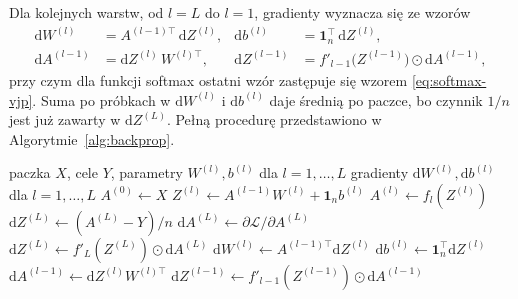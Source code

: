 Dla kolejnych warstw, od $l = L$ do $l = 1$, gradienty wyznacza się ze wzorów
\begin{equation}
    \begin{aligned}
        \mathrm{d}W^{(l)} &= A^{(l-1)\top} \, \mathrm{d}Z^{(l)}, &
        \mathrm{d}b^{(l)} &= \mathbf{1}_n^{\top} \, \mathrm{d}Z^{(l)}, \\
        \mathrm{d}A^{(l-1)} &= \mathrm{d}Z^{(l)} \, W^{(l)\top}, &
        \mathrm{d}Z^{(l-1)} &= f'_{l-1}\big(Z^{(l-1)}\big) \odot \mathrm{d}A^{(l-1)} ,
    \end{aligned}
    \label{eq:backprop}
\end{equation}
przy czym dla funkcji softmax ostatni wzór zastępuje się wzorem \eqref{eq:softmax-vjp}. Suma po próbkach w $\mathrm{d}W^{(l)}$ i $\mathrm{d}b^{(l)}$ daje średnią po paczce, bo czynnik $1/n$ jest już zawarty w $\mathrm{d}Z^{(L)}$. Pełną procedurę przedstawiono w Algorytmie~\ref{alg:backprop}.

\begin{algorithm}[H]
    \caption{Gradient straty dla jednej paczki próbek}
    \label{alg:backprop}
    \begin{algorithmic}[1]
        \Require paczka $X$, cele $Y$, parametry $W^{(l)}, b^{(l)}$ dla $l = 1, \dots, L$
        \Ensure gradienty $\mathrm{d}W^{(l)}, \mathrm{d}b^{(l)}$ dla $l = 1, \dots, L$
        \State $A^{(0)} \gets X$
         
            \State $Z^{(l)} \gets A^{(l-1)} W^{(l)} + \mathbf{1}_n b^{(l)}$
            \State $A^{(l)} \gets f_l(Z^{(l)})$ 
        \EndFor
            \State $\mathrm{d}Z^{(L)} \gets (A^{(L)} - Y) / n$ 
        \Else
            \State $\mathrm{d}A^{(L)} \gets \partial \mathcal{L} / \partial A^{(L)}$
            \State $\mathrm{d}Z^{(L)} \gets f'_L(Z^{(L)}) \odot \mathrm{d}A^{(L)}$ 
        \EndIf
         
            \State $\mathrm{d}W^{(l)} \gets A^{(l-1)\top} \mathrm{d}Z^{(l)}$
            \State $\mathrm{d}b^{(l)} \gets \mathbf{1}_n^{\top} \mathrm{d}Z^{(l)}$
                \State $\mathrm{d}A^{(l-1)} \gets \mathrm{d}Z^{(l)} W^{(l)\top}$
                \State $\mathrm{d}Z^{(l-1)} \gets f'_{l-1}(Z^{(l-1)}) \odot \mathrm{d}A^{(l-1)}$
            \EndIf
        \EndFor
    \end{algorithmic}
\end{algorithm}

